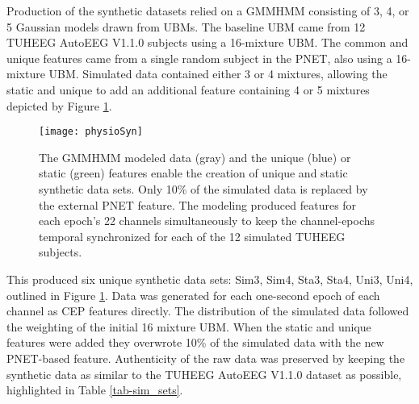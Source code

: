 Production of the synthetic datasets relied on a \ac{GMMHMM} consisting of 3, 4, or 5 Gaussian models drawn from \acp{UBM}. The baseline \ac{UBM} came from 12 \ac{TUHEEG} AutoEEG V1.1.0 subjects using a 16-mixture \ac{UBM}. The common and unique features came from a single random subject in the \ac{PNET}, also using a 16-mixture \ac{UBM}. Simulated data contained either 3 or 4 mixtures, allowing the static and unique to add an additional feature containing 4 or 5 mixtures depicted by Figure \ref{fig-simData}. 


\begin{figure}[!t]
\centering
\texttt{[image: physioSyn]}
\caption[Generation of synthetic data from the \acs{TUHEEG}.]{The \ac{GMMHMM} modeled data (gray) and the unique (blue) or static (green) features enable the creation of unique and static synthetic data sets. Only 10\% of the simulated data is replaced by the external \ac{PNET} feature. The modeling produced features for each epoch's 22 channels simultaneously to keep the channel-epochs temporal synchronized for each of the 12 simulated \ac{TUHEEG} subjects.}
\label{fig-simData}
\end{figure}

This produced six unique synthetic data sets: Sim3, Sim4, Sta3, Sta4, Uni3, Uni4, outlined in Figure \ref{fig-simData}. Data was generated for each one-second epoch of each channel as \ac{CEP} features directly. The distribution of the simulated data followed the weighting of the initial 16 mixture \ac{UBM}. When the static and unique features were added they overwrote 10\% of the simulated data with the new \ac{PNET}-based feature. Authenticity of the raw data was preserved by keeping the synthetic data as similar to the \ac{TUHEEG} AutoEEG V1.1.0 dataset as possible, highlighted in Table \ref{tab-sim_sets}.

